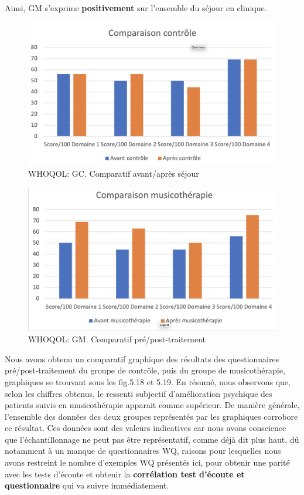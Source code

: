                  Ainsi,  GM s'exprime
                 \textbf{positivement }
                 sur l'ensemble du séjour en clinique.

    
                
\begin{figure}
\centering
\includegraphics[width=0.7\linewidth]{images/Compcontrole.png}
\caption[Schéma du déroulement]{WHOQOL:  GC. Comparatif avant/après séjour}
       
\end{figure}

\begin{figure}
\centering
\includegraphics[width=0.7\linewidth]{images/Compmusico.png}
\caption[Schéma du déroulement]{ WHOQOL: GM. Comparatif pré/post-traitement }
       
\end{figure}


Nous avons obtenu un comparatif graphique  des résultats des
                 questionnaires pré/post-traitement du groupe de contrôle,
                 puis du groupe de musicothérapie, graphiques se trouvant sous les fig.5.18 et 5.19.
       En résumé, nous observons que, selon les chiffres obtenus, le ressenti
       subjectif d'amélioration psychique 
        des patients suivis en musicothérapie apparait comme
        supérieur.
        De manière générale, l'ensemble des données des deux groupes représentés
        par les graphiques corrobore ce résultat.
        Ces données sont des valeurs indicatives car nous avons conscience que l'échantillonnage ne
        peut pas être représentatif, comme déjà dit plus haut, dû
        notamment à un
        manque de
        questionnaires WQ, raisons pour lesquelles nous avons
        restreint le nombre d'exemples WQ présentés ici, pour obtenir
        une parité avec les tests d'écoute et obtenir la
        \textbf{corrélation test d'écoute et questionnaire} qui va
        suivre immédiatement.
        
